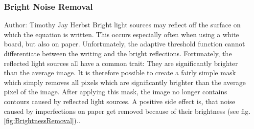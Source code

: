 \documentclass[12pt]{article}
\begin{document}
	\subsubsection{Bright Noise Removal}
	\small{Author: Timothy Jay Herbst} \newline \newline
	Bright light sources may reflect off the surface on which the equation is written.
	This occurs especially often when using a white board, but also on paper.
	Unfortunately, the adaptive threshold function cannot differentiate between the writing and the bright reflections.
	Fortunately, the reflected light sources all have a common trait:
	They are significantly brighter than the average image.
	It is therefore possible to create a fairly simple mask which simply removes all pixels which are significantly brighter than the average pixel of the image.
	After applying this mask, the image no longer contains contours caused by reflected light sources. %
	A positive side effect is, that noise caused by imperfections on paper get removed because of their brightness (see fig. \ref{fig:BrightnessRemoval})..
	
\end{document}
